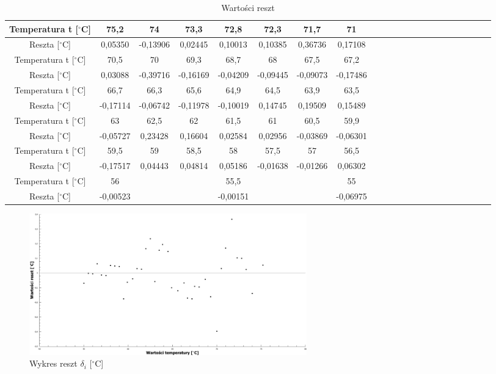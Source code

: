 \documentclass[10pt,a4paper]{article}
\begin{document}
\begin{center}
 \begin{table}[h!]
 \centering
 \caption{Wartości reszt}
 \begin{tabular}{|c|c|c|c|c|c|c|c|c|c|c|c|c|c|c|c|c|c|c|c|c|c|}
\hline
Temperatura t [$^{\circ}$C]&75,2     & 74       & 73,3     & 72,8     & 72,3     & 71,7     & 71       \\ \hline
Reszta [$^{\circ}$C]&0,05350  & -0,13906 & 0,02445  & 0,10013  & 0,10385  & 0,36736  & 0,17108  \\ \hline
Temperatura t [$^{\circ}$C]&70,5     & 70       & 69,3     & 68,7     & 68       & 67,5     & 67,2     \\ \hline
Reszta [$^{\circ}$C]&0,03088  & -0,39716 & -0,16169 & -0,04209 & -0,09445 & -0,09073 & -0,17486 \\ \hline
Temperatura t [$^{\circ}$C]&66,7     & 66,3     & 65,6     & 64,9     & 64,5     & 63,9     & 63,5     \\ \hline
Reszta [$^{\circ}$C]&-0,17114 & -0,06742 & -0,11978 & -0,10019 & 0,14745  & 0,19509  & 0,15489  \\ \hline
Temperatura t [$^{\circ}$C]&63       & 62,5     & 62       & 61,5     & 61       & 60,5     & 59,9     \\ \hline
Reszta [$^{\circ}$C]&-0,05727 & 0,23428  & 0,16604  & 0,02584  & 0,02956  & -0,03869 & -0,06301 \\ \hline
Temperatura t [$^{\circ}$C]&59,5     & 59       & 58,5     & 58       & 57,5     & 57       & 56,5     \\ \hline
Reszta [$^{\circ}$C]&-0,17517 & 0,04443  & 0,04814  & 0,05186  & -0,01638 & -0,01266 & 0,06302  \\ \hline
Temperatura t [$^{\circ}$C]&56       &          &          & 55,5     &          &          & 55       \\ \hline
Reszta [$^{\circ}$C]&-0,00523 &          &          & -0,00151 &          &          & -0,06975 \\ \hline
\end{tabular}
 \end{table}
 \end{center}


\begin{figure}[h!]
\includegraphics[width=12cm]{rys6.pdf} 
\centering
\caption{Wykres reszt $\delta_{i}$ [$^{\circ}$C]}
\end{figure}
\end{document}
